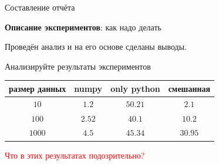 \documentclass[fleqn, xcolor=x11names]{beamer}
\begin{document}
\begin{section}{Составление отчёта}
\begin{frame}{\textbf{Описание экспериментов}: как  надо делать}
\begin{center}
\end{center}
Проведён анализ и на его основе сделаны выводы.
\end{frame}

\begin{frame}{Анализируйте результаты экспериментов}
\begin{table}[]
    \begin{tabular}{|c|c|c|c|}
        \hline
        размер данных & numpy & only python & смешанная \\ \hline
        $10$                                      & $1.2$   & $50.21$      & $2.1$       \\ \hline
        $100$                                     & $2.52$  & $40.1$       & $10.2$      \\ \hline
        $1000$                                    & $4.5$   & $45.34$      & $30.95$     \\ \hline
    \end{tabular}
\end{table}

\hfill

\textcolor{red}{Что в этих результатах подозрительно?}

\hfill
{}
\end{frame}


\end{section}
\end{document}
